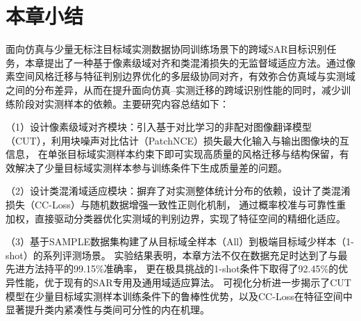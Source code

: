 \section{本章小结}
面向仿真与少量无标注目标域实测数据协同训练场景下的跨域SAR目标识别任务，本章提出了一种基于像素级域对齐和类混淆损失的无监督域适应方法。通过像素空间风格迁移与特征判别边界优化的多层级协同对齐，有效弥合仿真域与实测域之间的分布差异，从而在提升面向仿真--实测迁移的跨域识别性能的同时，减少训练阶段对实测样本的依赖。主要研究内容总结如下：

（1）设计像素级域对齐模块：引入基于对比学习的非配对图像翻译模型（CUT），利用块噪声对比估计（PatchNCE）损失最大化输入与输出图像块的互信息，
在单张目标域实测样本约束下即可实现高质量的风格迁移与结构保留，有效解决了少量目标域实测样本参与训练条件下生成质量差的问题。

（2）设计类混淆域适应模块：摒弃了对实测整体统计分布的依赖，设计了类混淆损失（CC-Loss）与随机数据增强一致性正则化机制，
通过概率校准与可靠性重加权，直接驱动分类器优化实测域的判别边界，实现了特征空间的精细化适应。

（3）基于SAMPLE数据集构建了从目标域全样本（All）到极端目标域少样本（1-shot）的系列评测场景。
实验结果表明，本章方法不仅在数据充足时达到了与最先进方法持平的99.15\%准确率，
更在极具挑战的1-shot条件下取得了92.45\%的优异性能，优于现有的SAR专用及通用域适应算法。
可视化分析进一步揭示了CUT模型在少量目标域实测样本训练条件下的鲁棒性优势，以及CC-Loss在特征空间中显著提升类内紧凑性与类间可分性的内在机理。


